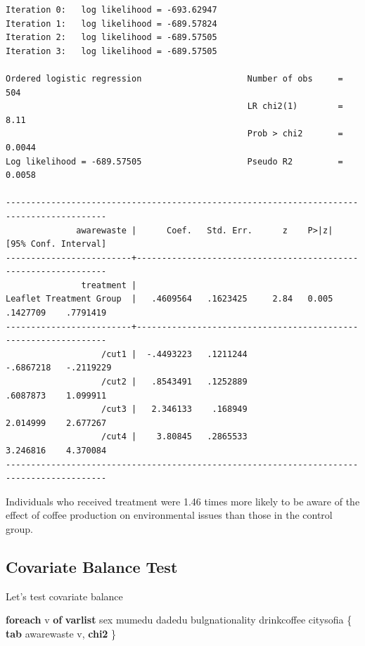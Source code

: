 \documentclass[
]{book}
\newenvironment{Shaded}{\begin{snugshade}}{\end{snugshade}}
\newcommand{\FunctionTok}[1]{\textcolor[rgb]{0.13,0.29,0.53}{\textbf{#1}}}
\newcommand{\KeywordTok}[1]{\textcolor[rgb]{0.13,0.29,0.53}{\textbf{#1}}}
\newcommand{\NormalTok}[1]{#1}
\newcommand{\OtherTok}[1]{\textcolor[rgb]{0.56,0.35,0.01}{#1}}
\begin{document}
\begin{verbatim}
Iteration 0:   log likelihood = -693.62947  
Iteration 1:   log likelihood = -689.57824  
Iteration 2:   log likelihood = -689.57505  
Iteration 3:   log likelihood = -689.57505  

Ordered logistic regression                     Number of obs     =        504
                                                LR chi2(1)        =       8.11
                                                Prob > chi2       =     0.0044
Log likelihood = -689.57505                     Pseudo R2         =     0.0058

------------------------------------------------------------------------------------------
              awarewaste |      Coef.   Std. Err.      z    P>|z|     [95% Conf. Interval]
-------------------------+----------------------------------------------------------------
               treatment |
Leaflet Treatment Group  |   .4609564   .1623425     2.84   0.005     .1427709    .7791419
-------------------------+----------------------------------------------------------------
                   /cut1 |  -.4493223   .1211244                     -.6867218   -.2119229
                   /cut2 |   .8543491   .1252889                      .6087873    1.099911
                   /cut3 |   2.346133    .168949                      2.014999    2.677267
                   /cut4 |    3.80845   .2865533                      3.246816    4.370084
------------------------------------------------------------------------------------------
\end{verbatim}

Individuals who received treatment were 1.46 times more likely to be aware of the effect of coffee production on environmental issues than those in the control group.

\subsection{Covariate Balance Test}\label{covariate-balance-test}

Let's test covariate balance

\begin{Shaded}
\begin{Highlighting}[]
\KeywordTok{foreach}\NormalTok{ v }\KeywordTok{of} \KeywordTok{varlist}\NormalTok{ sex mumedu dadedu bulgnationality drinkcoffee citysofia \{}
  \KeywordTok{tab}\NormalTok{ awarewaste }\OtherTok{\textasciigrave{}v\textquotesingle{}}\NormalTok{, }\FunctionTok{chi2}
\NormalTok{\}}
\end{Highlighting}
\end{Shaded}
\end{document}
